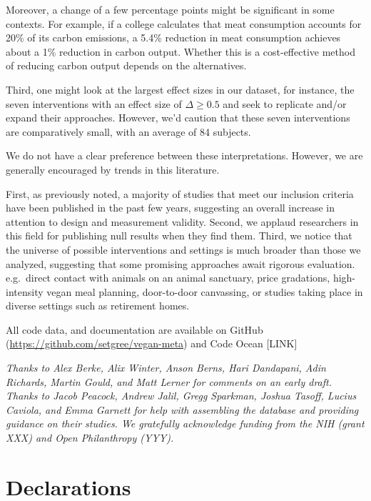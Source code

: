\documentclass[sn-nature,pdflatex]{sn-jnl}
\begin{document}
Moreover, a change of a few percentage points might be significant in
some contexts. For example, if a college calculates that meat
consumption accounts for 20\% of its carbon emissions, a 5.4\% reduction
in meat consumption \citep{jalil2023} achieves about a 1\% reduction in
carbon output. Whether this is a cost-effective method of reducing
carbon output depends on the alternatives.

Third, one might look at the largest effect sizes in our dataset, for
instance, the seven interventions with an effect size of
\(\Delta \geq 0.5\)
\citep{bianchi2022, carfora2023, merrill2009, piester2020} and seek to
replicate and/or expand their approaches. However, we'd caution that
these seven interventions are comparatively small, with an average of 84
subjects.

We do not have a clear preference between these interpretations.
However, we are generally encouraged by trends in this literature.

First, as previously noted, a majority of studies that meet our
inclusion criteria have been published in the past few years, suggesting
an overall increase in attention to design and measurement validity.
Second, we applaud researchers in this field for publishing null results
when they find them. Third, we notice that the universe of possible
interventions and settings is much broader than those we analyzed,
suggesting that some promising approaches await rigorous evaluation.
e.g.~direct contact with animals on an animal sanctuary, price
gradations, high-intensity vegan meal planning, door-to-door canvassing,
or studies taking place in diverse settings such as retirement homes.

\backmatter


All code data, and documentation are available on GitHub
(\url{https://github.com/setgree/vegan-meta}) and Code Ocean {[}LINK{]}


\emph{Thanks to Alex Berke, Alix Winter, Anson Berns, Hari Dandapani,
Adin Richards, Martin Gould, and Matt Lerner for comments on an early
draft. Thanks to Jacob Peacock, Andrew Jalil, Gregg Sparkman, Joshua
Tasoff, Lucius Caviola, and Emma Garnett for help with assembling the
database and providing guidance on their studies. We gratefully
acknowledge funding from the NIH (grant XXX) and Open Philanthropy
(YYY).}

\section*{Declarations}\label{declarations}
\end{document}
